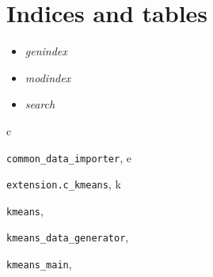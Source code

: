 \documentclass[letterpaper,10pt,english]{sphinxmanual}
\begin{document}
\chapter{Indices and tables}
\label{index:indices-and-tables}\begin{itemize}
\item {} 
\emph{genindex}

\item {} 
\emph{modindex}

\item {} 
\emph{search}

\end{itemize}


\renewcommand{\indexname}{Python Module Index}
\begin{theindex}
\def\bigletter#1{{\Large\sffamily#1}\nopagebreak\vspace{1mm}}
\bigletter{c}
\item {\texttt{common\_data\_importer}}, \pageref{common:module-common_data_importer}
\indexspace
\bigletter{e}
\item {\texttt{extension.c\_kmeans}}, \pageref{kmeans:module-extension.c_kmeans}
\indexspace
\bigletter{k}
\item {\texttt{kmeans}}, \pageref{kmeans:module-kmeans}
\item {\texttt{kmeans\_data\_generator}}, \pageref{kmeans:module-kmeans_data_generator}
\item {\texttt{kmeans\_main}}, \pageref{kmeans:module-kmeans_main}
\end{theindex}

\renewcommand{\indexname}{Index}
\printindex
\end{document}
